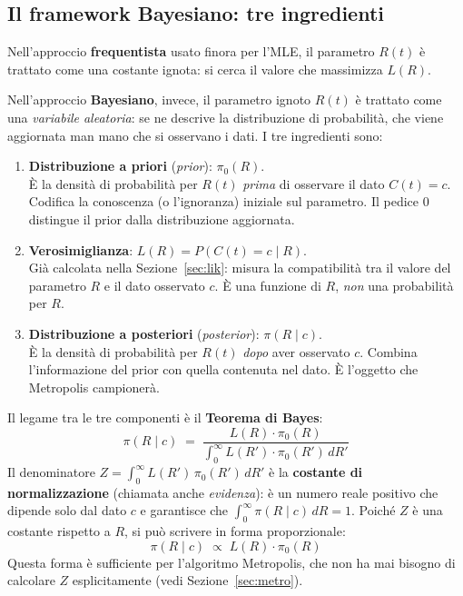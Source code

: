 \documentclass[12pt,a4paper]{article}
\begin{document}
\subsection{Il framework Bayesiano: tre ingredienti}

Nell'approccio \textbf{frequentista} usato finora per l'MLE, il parametro $R(t)$ è
trattato come una costante ignota: si cerca il valore che massimizza $L(R)$.

Nell'approccio \textbf{Bayesiano}, invece, il parametro ignoto $R(t)$ è trattato come
una \emph{variabile aleatoria}: se ne descrive la distribuzione di probabilità, che viene
aggiornata man mano che si osservano i dati. I tre ingredienti sono:

\begin{enumerate}
  \item \textbf{Distribuzione a priori} (\emph{prior}): $\pi_0(R)$.\\
        È la densità di probabilità per $R(t)$ \emph{prima} di osservare il dato
        $C(t) = c$. Codifica la conoscenza (o l'ignoranza) iniziale sul parametro.
        Il pedice $0$ distingue il prior dalla distribuzione aggiornata.

  \item \textbf{Verosimiglianza}: $L(R) = P\!\left(C(t) = c \mid R\right)$.\\
        Già calcolata nella Sezione~\ref{sec:lik}: misura la compatibilità tra il
        valore del parametro $R$ e il dato osservato $c$. È una funzione di $R$,
        \emph{non} una probabilità per $R$.

  \item \textbf{Distribuzione a posteriori} (\emph{posterior}): $\pi(R \mid c)$.\\
        È la densità di probabilità per $R(t)$ \emph{dopo} aver osservato $c$.
        Combina l'informazione del prior con quella contenuta nel dato.
        È l'oggetto che Metropolis campionerà.
\end{enumerate}

Il legame tra le tre componenti è il \textbf{Teorema di Bayes}:
\begin{equation}
  \pi(R \mid c)
  \;=\;
  \frac{L(R)\cdot\pi_0(R)}{\displaystyle\int_0^{\infty} L(R')\cdot\pi_0(R')\,dR'}
  \label{eq:bayes_formula}
\end{equation}
Il denominatore $Z = \int_0^{\infty} L(R')\,\pi_0(R')\,dR'$ è la
\textbf{costante di normalizzazione} (chiamata anche \emph{evidenza}): è un numero
reale positivo che dipende solo dal dato $c$ e garantisce che
$\int_0^\infty \pi(R \mid c)\,dR = 1$. Poiché $Z$ è una costante rispetto a $R$,
si può scrivere in forma proporzionale:
\begin{equation}
  \pi(R \mid c) \;\propto\; L(R)\cdot\pi_0(R)
  \label{eq:bayes_prop}
\end{equation}
Questa forma è sufficiente per l'algoritmo Metropolis, che non ha mai bisogno
di calcolare $Z$ esplicitamente (vedi Sezione~\ref{sec:metro}).
\end{document}
